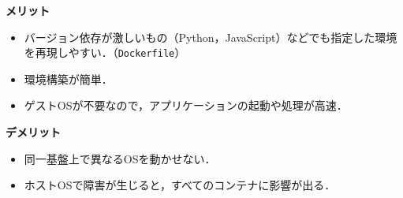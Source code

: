 \begin{frame}[t]{\ftitle}
    \begin{minipage}[t]{.48\textwidth}
        \textbf{\cmark メリット}
        \begin{itemize}
            \item バージョン依存が激しいもの（Python，JavaScript）などでも指定した環境を再現しやすい．（\texttt{Dockerfile}）
            \item 環境構築が簡単．
            \item ゲストOSが不要なので，アプリケーションの起動や処理が高速．
        \end{itemize}
    \end{minipage}
    \begin{minipage}[t]{.48\textwidth}
        \textbf{\xmark デメリット}
        \begin{itemize}
            \item 同一基盤上で異なるOSを動かせない．
            \item ホストOSで障害が生じると，すべてのコンテナに影響が出る．
        \end{itemize}
    \end{minipage}
\end{frame}